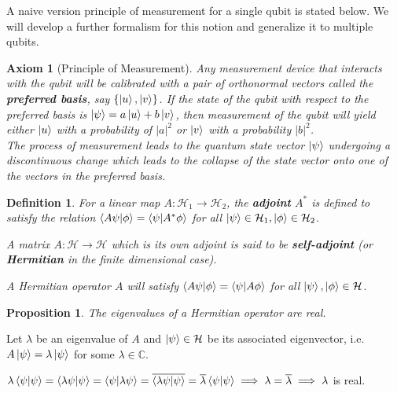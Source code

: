 \documentclass[12pt,twoside,fleqn]{report}
\makeatletter
\theoremstyle{thmstyle}
\renewenvironment{proof}[1][\proofname]{\par
\pushQED{\qed}%
\normalfont \topsep6\p@\@plus6\p@\relax
\trivlist
\item[\hskip\labelsep\itshape#1\@addpunct{.}]\mbox{}\par\nobreak\ignorespaces
}{%
    \popQED\endtrivlist\@endpefalse
    }
\newtheorem{defn}{Definition}[chapter]
\newtheorem{prop}{Proposition}[chapter]
\newtheorem{axiom}{Axiom}[chapter]
\makeatother
\begin{document}
A naive version principle of measurement for a single qubit is stated below. We will develop a further formalism for this notion and generalize it to multiple qubits.
\begin{samepage}
\begin{mdframed}
\begin{axiom}[Principle of Measurement]
    Any measurement device that interacts with the qubit will be calibrated with a pair of orthonormal vectors called the \textbf{preferred basis}, say $\{ \ket{u}, \ket{v} \}$. If the state of the qubit with respect to the preferred basis is $\ket{\psi} = a \ket{u} + b \ket{v}$, then measurement of the qubit will yield either $\ket{u}$ with a probability of $|a|^2$ or $\ket{v}$ with a probability $|b|^2$. \\
The process of measurement leads to the quantum state vector $\ket{\psi}$ undergoing a discontinuous change which leads to the collapse of the state vector onto one of the vectors in the preferred basis.
\end{axiom}
\end{mdframed}
\end{samepage}

\begin{defn}
    For a linear map $A: \mathcal{H}_1 \to \mathcal{H}_2$, the \textbf{adjoint} $A^*$ is defined to satisfy the relation 
    $\braket{A \psi| \phi} = \braket{\psi | A^* \phi}$ for all $\ket\psi \in \mathcal{H}_1,\ket\phi \in \mathcal{H}_2$.

    A matrix $A: \mathcal{H} \to \mathcal{H}$ which is its own adjoint is said to be \textbf{self-adjoint} (or \textbf{Hermitian} in the finite dimensional case).

    A Hermitian operator $A$ will satisfy $\braket{A \psi | \phi} = \braket{\psi | A \phi}$ for all $\ket\psi, \ket\phi\in \mathcal{H}$.
\end{defn}

\begin{prop}
    The eigenvalues of a Hermitian operator are real.
\end{prop}
\begin{proof}
    Let $\lambda$ be an eigenvalue of $A$ and $\ket\psi \in \mathcal{H}$ be its associated eigenvector, i.e. $A \ket\psi = \lambda \ket\psi$ for some $\lambda \in \mathbb{C}$.

    $\lambda\braket{\psi|\psi} = \braket{\lambda \psi|\psi} = \braket{\psi|\lambda \psi} = \overline{\braket{\lambda \psi | \psi}} = \overline{\lambda} \braket{\psi|\psi} \implies \lambda = \overline{\lambda} \implies \lambda $ is real.

\end{proof}
\end{document}
